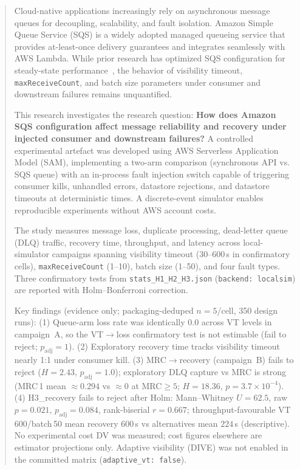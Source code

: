 \begin{abstract}

Cloud-native applications increasingly rely on asynchronous message queues for decoupling, scalability, and fault isolation. Amazon Simple Queue Service (SQS) is a widely adopted managed queueing service that provides at-least-once delivery guarantees and integrates seamlessly with AWS Lambda. While prior research has optimized SQS configuration for steady-state performance~\citep{Kyrychenko2025}, the behavior of visibility timeout, \texttt{maxReceiveCount}, and batch size parameters under consumer and downstream failures remains unquantified.

This research investigates the research question: \textbf{How does Amazon SQS configuration affect message reliability and recovery under injected consumer and downstream failures?} A controlled experimental artefact was developed using AWS Serverless Application Model (SAM), implementing a two-arm comparison (synchronous API vs. SQS queue) with an in-process fault injection switch capable of triggering consumer kills, unhandled errors, datastore rejections, and datastore timeouts at deterministic times. A discrete-event simulator enables reproducible experiments without AWS account costs.

The study measures message loss, duplicate processing, dead-letter queue (DLQ) traffic, recovery time, throughput, and latency across local-simulator campaigns spanning visibility timeout (30–600\,s in confirmatory cells), \texttt{maxReceiveCount} (1–10), batch size (1–50), and four fault types. Three confirmatory tests from \texttt{stats\_H1\_H2\_H3.json} (\texttt{backend: localsim}) are reported with Holm--Bonferroni correction.

Key findings (evidence only; packaging-deduped $n=5$/cell, 350 design runs): (1) Queue-arm loss rate was identically 0.0 across VT levels in campaign~A, so the VT$\rightarrow$loss confirmatory test is not estimable (fail to reject; $p_{\mathrm{adj}}=1$). (2) Exploratory recovery time tracks visibility timeout nearly 1:1 under consumer kill. (3) MRC$\rightarrow$recovery (campaign~B) fails to reject ($H=2.43$, $p_{\mathrm{adj}}=1.0$); exploratory DLQ capture vs MRC is strong (MRC\,1 mean $\approx0.294$ vs $\approx0$ at MRC$\ge5$; $H=18.36$, $p=3.7\times10^{-4}$). (4) H3\_recovery fails to reject after Holm: Mann--Whitney $U=62.5$, raw $p=0.021$, $p_{\mathrm{adj}}=0.084$, rank-biserial $r=0.667$; throughput-favourable VT\,600/batch\,50 mean recovery $600$\,s vs alternatives mean $224$\,s (descriptive). No experimental cost DV was measured; cost figures elsewhere are estimator projections only. Adaptive visibility (DIVE) was not enabled in the committed matrix (\texttt{adaptive\_vt: false}).


\end{abstract}
